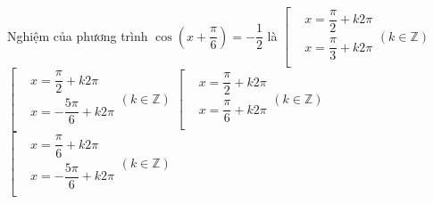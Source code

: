 \begin{ex}%
	Nghiệm của phương trình $\cos \left( x+\dfrac{\pi }{6} \right)=-\dfrac{1}{2}$ là
	\choice
	{$\left[ \begin{aligned}
		  & x=\dfrac{\pi }{2}+k2\pi  \\ 
		 & x=\dfrac{\pi }{3}+k2\pi  \\ 
		\end{aligned} \right.\left( k\in \mathbb{Z} \right)$}
	{\True $\left[ \begin{aligned}
		  & x=\dfrac{\pi }{2}+k2\pi  \\ 
		 & x=-\dfrac{5\pi }{6}+k2\pi  \\ 
		\end{aligned} \right.\left( k\in \mathbb{Z} \right)$}
	{$\left[ \begin{aligned}
		  & x=\dfrac{\pi }{2}+k2\pi  \\ 
		 & x=\dfrac{\pi }{6}+k2\pi  \\ 
		\end{aligned} \right.\left( k\in \mathbb{Z} \right)$}
	{$\left[ \begin{aligned}
		  & x=\dfrac{\pi }{6}+k2\pi  \\ 
		 & x=-\dfrac{5\pi }{6}+k2\pi  \\ 
		\end{aligned} \right.\left( k\in \mathbb{Z} \right)$}
	\loigiai{
		Ta có $\cos \left( x+\dfrac{\pi }{6} \right)=-\dfrac{1}{2}\Leftrightarrow \left[ \begin{aligned}
		  & x+\dfrac{\pi }{6}=\dfrac{2\pi }{3}+k2\pi  \\ 
		 & x+\dfrac{\pi }{6}=-\dfrac{2\pi }{3}+k2\pi  \\ 
		\end{aligned} \right.\Leftrightarrow \left[ \begin{aligned}
		  & x=\dfrac{\pi }{2}+k2\pi  \\ 
		 & x=-\dfrac{5\pi }{6}+k2\pi  \\ 
		\end{aligned} \right.\left( k\in \mathbb{Z} \right)$.
	}
\end{ex}

